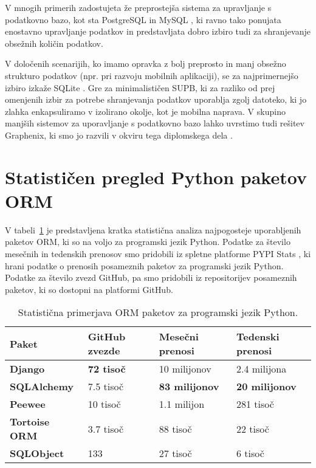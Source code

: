 \documentclass[a4paper,12pt,openright]{book}
\begin{document}
    V mnogih primerih zadostujeta že preprostejša sistema za upravljanje s podatkovno bazo, kot sta PostgreSQL \cite{POSTGRESQL} in MySQL \cite{MYSQL}, ki ravno tako ponujata enostavno upravljanje podatkov in predstavljata dobro izbiro tudi za shranjevanje obsežnih količin podatkov. 
    
    V določenih scenarijih, ko imamo opravka z bolj preprosto in manj obsežno strukturo podatkov (npr. pri razvoju mobilnih aplikaciji), se za najprimernejšo izbiro izkaže SQLite \cite{SQLITE}. Gre za minimalističen SUPB, ki za razliko od prej omenjenih izbir za potrebe shranjevanja podatkov uporablja zgolj datoteko, ki jo zlahka enkapsuliramo v izolirano okolje, kot je mobilna naprava. V skupino manjših sistemov za uporavljanje s podatkovno bazo lahko uvrstimo tudi rešitev Graphenix, ki smo jo razvili v okviru tega diplomskega dela \cite{GRAPHENIX_GITHUB}.
    
    \section{Statističen pregled Python paketov ORM}

    V tabeli~\ref{orm_library_comparison} je predstavljena kratka statistična analiza najpogosteje uporabljenih paketov ORM, ki so na voljo za programski jezik Python. Podatke za število mesečnih in tedenskih prenosov smo pridobili iz spletne platforme PYPI Stats \cite{pypistats}, ki hrani podatke o prenosih posameznih paketov za programski jezik Python. Podatke za število zvezd GitHub, pa smo pridobili iz repositorijev posameznih paketov, ki so dostopni na platformi GitHub.
    
    \begin{table}[htbp]
        \begin{center}
            \begin{tabular}{p{}|p{}|p{}|p{}}
              {\bf Paket} & {\bf GitHub zvezde} & {\bf Mesečni prenosi} & {\bf Tedenski prenosi} \\ \hline
              {\bf Django \cite{DJANGO_GITHUB}} & \textbf{\num{72} tisoč} & \num{10} milijonov & \num{2,4} milijona \\
              {\bf SQLAlchemy \cite{SQLALCHEMY_GITHUB}} & \num{7,5} tisoč &  \textbf{\num{83} milijonov} & \textbf{\num{20} milijonov} \\
              {\bf Peewee \cite{PEEWEE_GITHUB}} & \num{10} tisoč & \num{1,1} milijon & \num{281} tisoč \\
              {\bf Tortoise ORM \cite{TORTOISE_GITHUB}} & \num{3,7} tisoč & \num{88} tisoč & \num{22} tisoč \\
              {\bf SQLObject \cite{SQLOBJECT_GITHUB}} & 133 & \num{27} tisoč & \num{6} tisoč \\
            \end{tabular}
        \end{center}
        \caption{Statistična primerjava ORM paketov za programski jezik Python.}
        \label{orm_library_comparison}
    \end{table}
    
\end{document}
